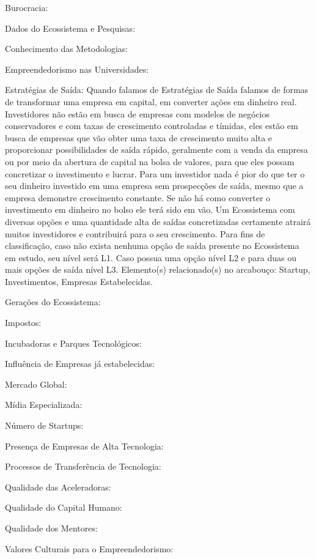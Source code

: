 \begin{description}
  \item Burocracia:
  \item Dados do Ecossistema e Pesquisas:
  \item Conhecimento das Metodologias:
  \item Empreendedorismo nas Universidades:
  \item Estratégias de Saída: Quando falamos de Estratégias de Saída falamos de formas de transformar uma empresa em capital, em converter ações em dinheiro real. Investidores não estão em busca de empresas com modelos de negócios conservadores e com taxas de crescimento controladas e tímidas, eles estão em busca de empresas que vão obter uma taxa de crescimento muito alta e proporcionar possibilidades de saída rápido, geralmente com a venda da empresa ou por meio da abertura de capital na bolsa de valores, para que eles possam concretizar o investimento e lucrar. Para um investidor nada é pior do que ter o seu dinheiro investido em uma empresa sem prospecções de saída, mesmo que a empresa demonstre crescimento constante. Se não há como converter o investimento em dinheiro no bolso ele terá sido em vão. Um Ecossistema com diversas opções e uma quantidade alta de saídas concretizadas certamente atrairá muitos investidores e contribuirá para o seu crescimento. Para fins de classificação, caso não exista nenhuma opção de saída presente no Ecossistema em estudo, seu nível será L1. Caso possua uma opção nível L2 e para duas ou mais opções de saída nível L3. Elemento(s) relacionado(s) no arcabouço: Startup, Investimentos, Empresas Estabelecidas.
  \item Gerações do Ecossistema:
  \item Impostos:
  \item Incubadoras e Parques Tecnológicos:
  \item Influência de Empresas já estabelecidas:
  \item Mercado Global:
  \item Mídia Especializada:
  \item Número de Startups:
  \item Presença de Empresas de Alta Tecnologia:
  \item Processos de Transferência de Tecnologia:
  \item Qualidade das Aceleradoras:
  \item Qualidade do Capital Humano:
  \item Qualidade dos Mentores:
  \item Valores Culturais para o Empreendedorismo:
\end{description}

